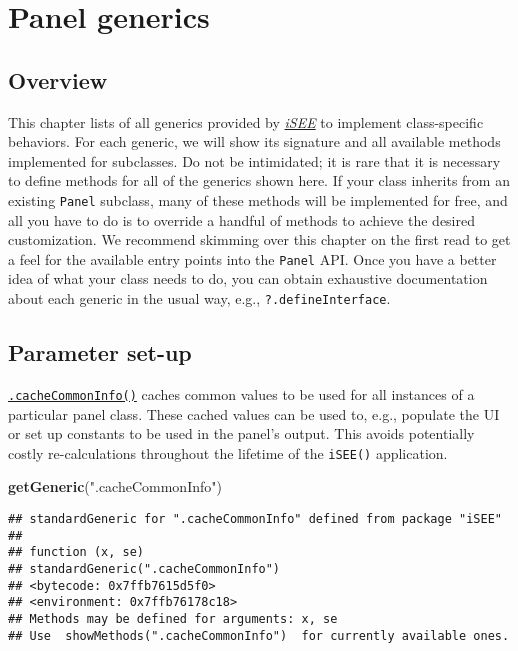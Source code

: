 \documentclass[
]{book}
\newenvironment{Shaded}{\begin{snugshade}}{\end{snugshade}}
\newcommand{\KeywordTok}[1]{\textcolor[rgb]{0.13,0.29,0.53}{\textbf{#1}}}
\newcommand{\NormalTok}[1]{#1}
\newcommand{\StringTok}[1]{\textcolor[rgb]{0.31,0.60,0.02}{#1}}
\begin{document}
\hypertarget{api}{%
\chapter{Panel generics}\label{api}}

\hypertarget{overview}{%
\section{Overview}\label{overview}}

This chapter lists of all generics provided by \emph{\href{https://bioconductor.org/packages/3.11/iSEE}{iSEE}} to implement class-specific behaviors.
For each generic, we will show its signature and all available methods implemented for subclasses.
Do not be intimidated; it is rare that it is necessary to define methods for all of the generics shown here.
If your class inherits from an existing \texttt{Panel} subclass, many of these methods will be implemented for free, and all you have to do is to override a handful of methods to achieve the desired customization.
We recommend skimming over this chapter on the first read to get a feel for the available entry points into the \texttt{Panel} API.
Once you have a better idea of what your class needs to do, you can obtain exhaustive documentation about each generic in the usual way, e.g., \texttt{?.defineInterface}.

\hypertarget{parameter-set-up}{%
\section{Parameter set-up}\label{parameter-set-up}}

\href{https://isee.github.io/iSEE/reference/setup-generics.html}{\texttt{.cacheCommonInfo()}} caches common values to be used for all instances of a particular panel class.
These cached values can be used to, e.g., populate the UI or set up constants to be used in the panel's output.
This avoids potentially costly re-calculations throughout the lifetime of the \texttt{iSEE()} application.

\begin{Shaded}
\begin{Highlighting}[]
\KeywordTok{getGeneric}\NormalTok{(}\StringTok{".cacheCommonInfo"}\NormalTok{)}
\end{Highlighting}
\end{Shaded}

\begin{verbatim}
## standardGeneric for ".cacheCommonInfo" defined from package "iSEE"
## 
## function (x, se) 
## standardGeneric(".cacheCommonInfo")
## <bytecode: 0x7ffb7615d5f0>
## <environment: 0x7ffb76178c18>
## Methods may be defined for arguments: x, se
## Use  showMethods(".cacheCommonInfo")  for currently available ones.
\end{verbatim}
\end{document}

